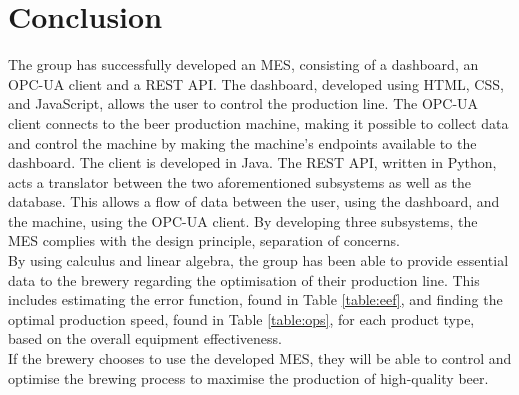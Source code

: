 \section{Conclusion}
The group has successfully developed an MES, consisting of a dashboard, an
OPC-UA client and a REST API. The dashboard, developed using HTML, CSS, and
JavaScript, allows the user to control the production line. The OPC-UA client
connects to the beer production machine, making it possible to collect data and
control the machine by making the machine's endpoints available to the
dashboard. The client is developed in Java. The REST API, written in Python,
acts a translator between the two aforementioned subsystems as well as the
database. This allows a flow of data between the user, using the dashboard, and
the machine, using the OPC-UA client. By developing three subsystems, the MES 
complies with the design principle, separation of concerns. \\

By using calculus and linear algebra, the group has been able to provide essential
data to the brewery regarding the optimisation of their production line. This
includes estimating the error function, found in Table \ref{table:eef}, and
finding the optimal production speed, found in Table \ref{table:ops}, for each
product type, based on the overall equipment effectiveness. \\

If the brewery chooses to use the developed MES, they will be able to control
and optimise the brewing process to maximise the production of high-quality beer.